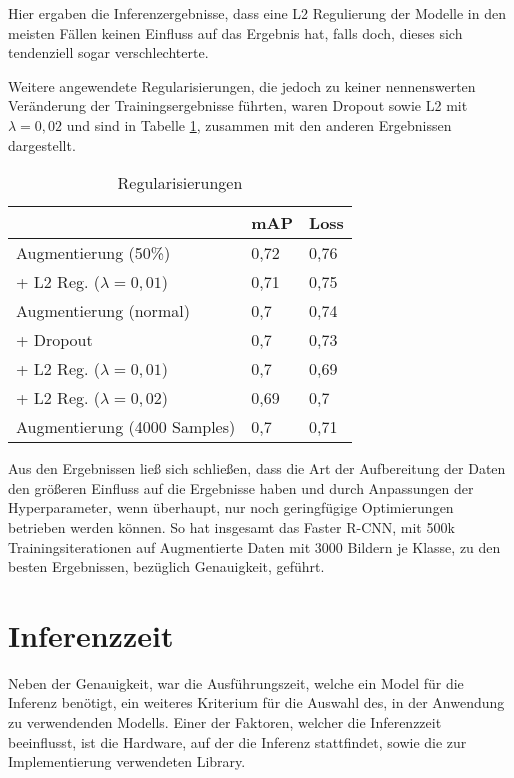 Hier ergaben die Inferenzergebnisse, dass 
eine L2 Regulierung der Modelle
in den meisten Fällen keinen Einfluss auf das Ergebnis
hat, falls doch, dieses sich tendenziell sogar
verschlechterte.

Weitere angewendete Regularisierungen, die jedoch 
zu keiner nennenswerten Veränderung der Trainingsergebnisse
führten, waren Dropout sowie L2 mit $\lambda = 0,02$ und sind in 
Tabelle \ref{table:reg}, zusammen mit den anderen Ergebnissen
dargestellt.
\vspace{1cm}

\begin{table}[htb]
  \centering
  \begin{tabular}{m{}|m{}<{\centering}m{}<{\centering}}
  \hline
                    & mAP  & Loss  \\ \hline\hline
  Augmentierung (50\%) &  0,72    &    0,76   \\
   + L2 Reg. ($\lambda = 0,01$)            &   0,71     & 0,75       \\\hline
  Augmentierung (normal)     & 0,7  & 0,74            \\
  + Dropout          & 0,7  & 0,73            \\
  + L2 Reg. ($\lambda = 0,01$)    & 0,7  & 0,69            \\
  + L2 Reg. ($\lambda = 0,02$)    & 0,69 & 0,7             \\ \hline
  Augmentierung (4000 Samples) &0,7&0,71\\\hline
  \end{tabular}
  \caption{Regularisierungen}
  \label{table:reg}
\end{table}
\vspace{1cm}

Aus den Ergebnissen ließ sich schließen, dass die Art
der Aufbereitung der Daten den größeren Einfluss auf die Ergebnisse
haben und durch Anpassungen der Hyperparameter, wenn überhaupt,
nur noch geringfügige Optimierungen betrieben werden können.
So hat insgesamt das Faster R-CNN, mit 500k Trainingsiterationen 
auf Augmentierte Daten mit 3000 Bildern je Klasse, zu
den besten Ergebnissen, bezüglich Genauigkeit, geführt.


\section{Inferenzzeit}\label{sec:infertime}

Neben der Genauigkeit, war die Ausführungszeit, welche ein Model
für die Inferenz benötigt, ein weiteres Kriterium für die Auswahl
des, in der Anwendung zu verwendenden Modells.
Einer der Faktoren, welcher die Inferenzzeit beeinflusst,
ist die Hardware, auf der die Inferenz stattfindet,
sowie die zur Implementierung verwendeten Library.


